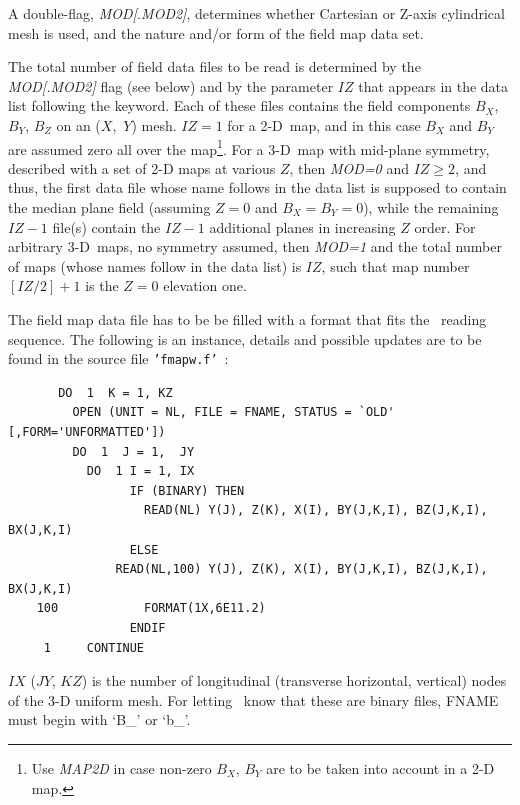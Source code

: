 {\medskip

\noindent A double-flag, \textsl{MOD[.MOD2]}, determines whether Cartesian or Z-axis cylindrical mesh is used, 
and the nature and/or form of the field map data set.

\medskip

\noindent The total number of field data files to be read is determined by the \textsl{MOD[.MOD2]} flag 
(see below) and by the parameter $IZ$ that appears in the data list following the keyword. 
Each of these files contains the field components $B_X$, $B_Y$, $B_Z$ on an 
\mbox{($X$, $Y$)} mesh. $IZ = 1$ for a 2-D~map, and 
in this case $B_X$ and $B_Y$ are assumed  zero all over the map\footnote{Use 
\textsl{MAP2D} in case non-zero $B_X$, $B_Y$ are to be taken into account in a 2-D map.}. 
For a 3-D~map with mid-plane symmetry, described with a set of 2-D maps at various $Z$, 
then  \textsl{MOD=0} and  $IZ\ge 2$, and thus, the first 
data file whose name follows in the data list is supposed to contain the median 
plane field (assuming $ Z=0 $ and  $ B_X=B_Y=0$), while the remaining  $IZ-1$ 
file(s) contain the $IZ-1$ additional  planes in increasing $Z$ order. For arbitrary 3-D~maps, 
 no  symmetry assumed, then  \textsl{MOD=1} and  
 the total number of maps (whose names follow in the data list) 
is $IZ$, such that  map number $[IZ/2]+1$ is the $Z = 0$ elevation one.

\medskip

\noindent The field map data file has to be be filled with a 
format that fits the  \FORTRAN\ reading sequence. 
The following is an instance, details and possible updates are to be found in the source  
file \texttt{'fmapw.f'}~:  

{\footnotesize
\begin{verbatim}
	   DO  1  K = 1, KZ
	     OPEN (UNIT = NL, FILE = FNAME, STATUS = `OLD' [,FORM='UNFORMATTED'])
	     DO  1  J = 1,  JY  
	       DO  1 I = 1, IX
                 IF (BINARY) THEN
                   READ(NL) Y(J), Z(K), X(I), BY(J,K,I), BZ(J,K,I), BX(J,K,I)
                 ELSE
	           READ(NL,100) Y(J), Z(K), X(I), BY(J,K,I), BZ(J,K,I), BX(J,K,I)
    100	           FORMAT(1X,6E11.2)
                 ENDIF
     1     CONTINUE
\end{verbatim}}
\medskip

\noindent $IX$ ($JY$, $KZ$)  is   the number of longitudinal 
(transverse horizontal, vertical) nodes of the 3-D uniform mesh. For letting \zgou\ know that these are binary files, 
FNAME must begin with  \mbox{`B\_'} or  \mbox{`b\_'}.  

}
